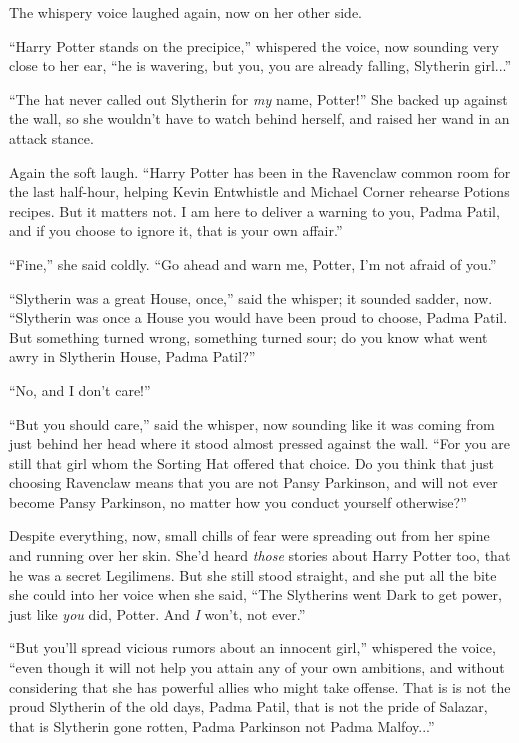 The whispery voice laughed again, now on her other side.

“Harry Potter stands on the precipice,” whispered the voice, now sounding very close to her ear, “he is wavering, but you, you are already falling, Slytherin girl...”

“The hat never called out Slytherin for \emph{my} name, Potter!” She backed up against the wall, so she wouldn’t have to watch behind herself, and raised her wand in an attack stance.

Again the soft laugh. “Harry Potter has been in the Ravenclaw common room for the last half-hour, helping Kevin Entwhistle and Michael Corner rehearse Potions recipes. But it matters not. I am here to deliver a warning to you, Padma Patil, and if you choose to ignore it, that is your own affair.”

“Fine,” she said coldly. “Go ahead and warn me, Potter, I’m not afraid of you.”

“Slytherin was a great House, once,” said the whisper; it sounded sadder, now. “Slytherin was once a House you would have been proud to choose, Padma Patil. But something turned wrong, something turned sour; do you know what went awry in Slytherin House, Padma Patil?”

“No, and I don’t care!”

“But you should care,” said the whisper, now sounding like it was coming from just behind her head where it stood almost pressed against the wall. “For you are still that girl whom the Sorting Hat offered that choice. Do you think that just choosing Ravenclaw means that you are not Pansy Parkinson, and will not ever become Pansy Parkinson, no matter how you conduct yourself otherwise?”

Despite everything, now, small chills of fear were spreading out from her spine and running over her skin. She’d heard \emph{those} stories about Harry Potter too, that he was a secret Legilimens. But she still stood straight, and she put all the bite she could into her voice when she said, “The Slytherins went Dark to get power, just like \emph{you} did, Potter. And \emph{I} won’t, not ever.”

“But you’ll spread vicious rumors about an innocent girl,” whispered the voice, “even though it will not help you attain any of your own ambitions, and without considering that she has powerful allies who might take offense. That is is not the proud Slytherin of the old days, Padma Patil, that is not the pride of Salazar, that is Slytherin gone rotten, Padma Parkinson not Padma Malfoy...”

